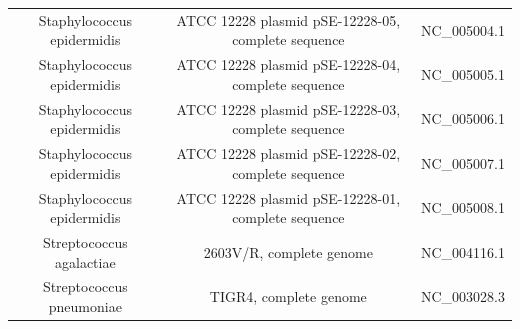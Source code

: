 \documentclass[10pt]{bmc_article}
\newenvironment{bmcformat}{\begin{raggedright}\baselineskip20pt\sloppy\setboolean{publ}{false}}{\end{raggedright}\baselineskip20pt\sloppy}
\begin{document}
\begin{bmcformat}
{\begin{tabular}{|c|c|c|}
        Staphylococcus epidermidis & ATCC 12228 plasmid pSE-12228-05, complete sequence &   NC\_005004.1 \\
        Staphylococcus epidermidis & ATCC 12228 plasmid pSE-12228-04, complete sequence &   NC\_005005.1 \\
        Staphylococcus epidermidis & ATCC 12228 plasmid pSE-12228-03, complete sequence &   NC\_005006.1 \\
        Staphylococcus epidermidis & ATCC 12228 plasmid pSE-12228-02, complete sequence &   NC\_005007.1 \\
        Staphylococcus epidermidis & ATCC 12228 plasmid pSE-12228-01, complete sequence &   NC\_005008.1 \\
        Streptococcus agalactiae & 2603V/R, complete genome & NC\_004116.1 \\
        Streptococcus pneumoniae & TIGR4, complete genome & NC\_003028.3 \\
	\hline
      \end{tabular}
      }

\end{bmcformat}
\end{document}
